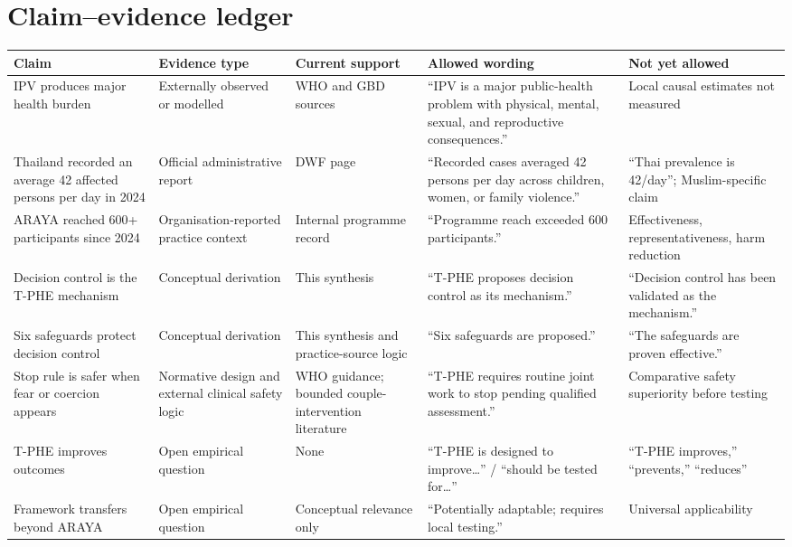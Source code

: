 \documentclass[10pt,twocolumn]{article}
\newcommand{\tphe}{T\mbox{-}PHE}
\begin{document}
\section{Claim--evidence ledger}
\footnotesize
\begin{tabularx}{\textwidth}{@{}YYYYY@{}}
\toprule
\textbf{Claim} & \textbf{Evidence type} & \textbf{Current support} & \textbf{Allowed wording} & \textbf{Not yet allowed}\\
\midrule
IPV produces major health burden & Externally observed or modelled & WHO and GBD sources & ``IPV is a major public-health problem with physical, mental, sexual, and reproductive consequences.'' & Local causal estimates not measured\\
Thailand recorded an average 42 affected persons per day in 2024 & Official administrative report & DWF page & ``Recorded cases averaged 42 persons per day across children, women, or family violence.'' & ``Thai prevalence is 42/day''; Muslim-specific claim\\
ARAYA reached 600+ participants since 2024 & Organisation-reported practice context & Internal programme record & ``Programme reach exceeded 600 participants.'' & Effectiveness, representativeness, harm reduction\\
Decision control is the \tphe{} mechanism & Conceptual derivation & This synthesis & ``\tphe{} proposes decision control as its mechanism.'' & ``Decision control has been validated as the mechanism.''\\
Six safeguards protect decision control & Conceptual derivation & This synthesis and practice-source logic & ``Six safeguards are proposed.'' & ``The safeguards are proven effective.''\\
Stop rule is safer when fear or coercion appears & Normative design and external clinical safety logic & WHO guidance; bounded couple-intervention literature & ``\tphe{} requires routine joint work to stop pending qualified assessment.'' & Comparative safety superiority before testing\\
\tphe{} improves outcomes & Open empirical question & None & ``\tphe{} is designed to improve\ldots'' / ``should be tested for\ldots'' & ``\tphe{} improves,'' ``prevents,'' ``reduces''\\
Framework transfers beyond ARAYA & Open empirical question & Conceptual relevance only & ``Potentially adaptable; requires local testing.'' & Universal applicability\\
\bottomrule
\end{tabularx}
\smallskip
\end{document}
